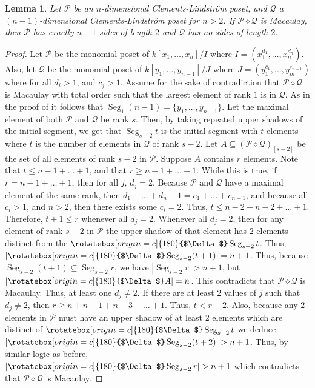 \documentclass[11pt, reqno]{amsart}
\newcommand{\Q}{{\mathcal Q}}
\renewcommand{\P}{{\mathcal P}}
\newcommand{\uSdw}{\rotatebox[origin=c]{180}{$\Delta$}}
\def\Seg{\operatorname{Seg}}
\theoremstyle{plain} %
\newtheorem{lem}[thm]{Lemma}
\theoremstyle{definition}
\theoremstyle{remark}
\numberwithin{equation}{section}  %
\begin{document}
\begin{lem} \label{lem: n-1 2s}
    Let $\P$ be an $n$-dimensional Clements-Lindstr\"om poset, and $\Q$ a $(n-1)$-dimensional Clements-Lindstr\"om poset for $n > 2$. If $\P \diamond \Q$ is Macaulay, then $\P$ has exactly $n-1$ sides of length $2$ and $\Q$ has no sides of length $2$.
\end{lem}
\begin{proof}
    Let $\P$ be the monomial poset of  $k[x_1,\dots,x_n]/I$ where $I = (x_1^{d_1},\dots,x_n^{d_n})$. Also, let $\Q$ be the monomial poset of $k[y_1,\dots,y_{n-1}]/J$ where $J = (y_1^{c_1},\dots,y_m^{c_{n-1}})$ where for all $d_i > 1$, and $c_j > 1$. 
    Assume for the sake of contradiction that $\P\diamond \Q$ is Macaulay with total order such that the largest element of rank $1$ is in $\Q$. %
    As in the proof of  it follows that $\Seg_1 (n-1) = \{y_1,\dots,y_{n-1}\}$. Let the maximal element of both $\P$ and $\Q$ be rank $s$. Then, by taking repeated upper shadows of the initial segment, we get that $\Seg_{s-2}t$ is the initial segment with $t$ elements where $t$ is the number of elements in $\Q$ of rank $s-2$. Let $A \subseteq (\P \diamond \Q)_{[s-2]}$ be the set of all elements of rank $s-2$ in $\P$. Suppose $A$ contains $r$ elements. Note that $t \leq n-1 + \dots + 1$, and that $r \geq n-1 + \dots + 1$. While this is true, if $r = n-1 + \dots + 1$, then for all $j$,  $d_j = 2$. Because $\P$ and $\Q$ have a maximal element of the same rank, then $d_1 + \dots + d_n - 1 = c_1 + \dots + c_{n-1}$, and because all $c_i > 1$, and $n > 2$, then there exists some $c_i = 2$. Thus, $t \leq n-2 + n-2 + \dots + 1$. Therefore, $t+1 \leq r$ whenever all $d_j = 2$. Whenever all $d_j = 2$, then for any element of rank $s-2$ in $\P$ the upper shadow of that element has $2$ elements distinct from the $\uSdw \Seg_{s-2} t$. Thus, $|\uSdw \Seg_{s-2} (t + 1)| = n+1$. Thus, because $\Seg_{s-2} (t+1) \subseteq \Seg_{s-2} r$, we have  $|\Seg_{s-2}r| > n+1$, but $|\uSdw A| = n$. This contradicts that $\P \diamond \Q$ is Macaulay. Thus, at least one $d_j \neq 2$. If there are at least $2$ values of $j$ such that $d_j \neq 2$, then $r \geq n + n - 1 + n - 3 + \dots + 1$. Thus, $t < r+2$. Also, because any $2$ elements in $\P$ must have an upper shadow of at least $2$ elements which are distinct of $\uSdw \Seg_{s-2} t$ we deduce $|\uSdw \Seg_{s-2} (t+2)| > n+1$. Thus, by similar logic as before, $|\uSdw \Seg_{s-2} r| > n+1$ which contradicts that $\P\diamond \Q$ is Macaulay. 
    

\end{proof}
\end{document}
